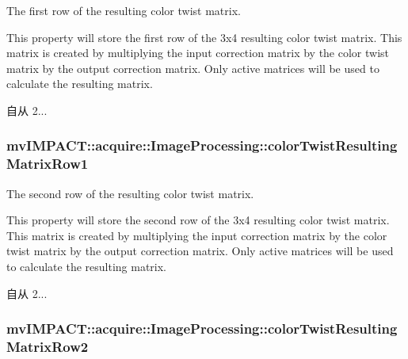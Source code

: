 The first row of the resulting color twist matrix. 

This property will store the first row of the 3x4 resulting color twist matrix. This matrix is created by multiplying the input correction matrix by the color twist matrix by the output correction matrix. Only active matrices will be used to calculate the resulting matrix.

\begin{DoxySince}{自从}
2... 
\end{DoxySince}
\hypertarget{classmv_i_m_p_a_c_t_1_1acquire_1_1_image_processing_a90cacc49731a478754e9c973a08e8a91}{
\subsubsection[{color\+Twist\+Resulting\+Matrix\+Row1}]{ mv\+I\+M\+P\+A\+C\+T\+::acquire\+::\+Image\+Processing\+::color\+Twist\+Resulting\+Matrix\+Row1}}\label{classmv_i_m_p_a_c_t_1_1acquire_1_1_image_processing_a90cacc49731a478754e9c973a08e8a91}


The second row of the resulting color twist matrix. 

This property will store the second row of the 3x4 resulting color twist matrix. This matrix is created by multiplying the input correction matrix by the color twist matrix by the output correction matrix. Only active matrices will be used to calculate the resulting matrix.

\begin{DoxySince}{自从}
2... 
\end{DoxySince}
\hypertarget{classmv_i_m_p_a_c_t_1_1acquire_1_1_image_processing_a357603532ef84699c0515474c3384dca}{
\subsubsection[{color\+Twist\+Resulting\+Matrix\+Row2}]{ mv\+I\+M\+P\+A\+C\+T\+::acquire\+::\+Image\+Processing\+::color\+Twist\+Resulting\+Matrix\+Row2}}\label{classmv_i_m_p_a_c_t_1_1acquire_1_1_image_processing_a357603532ef84699c0515474c3384dca}


